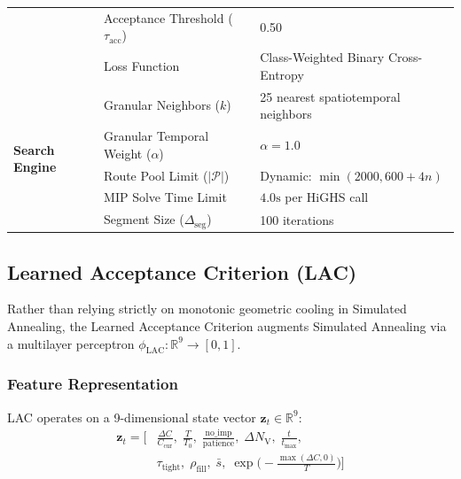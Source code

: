 \documentclass{ieeeaccess}
\newcommand{\NV}{{N_\mathrm{V}}}
\begin{document}
\begin{table}[!t]
\begin{tabularx}{\columnwidth}{l l X}
  & Acceptance Threshold ($\tau_{\text{acc}}$) & 0.50 \\
  & Loss Function & Class-Weighted Binary Cross-Entropy \\
\midrule
\multirow{5}{*}{\textbf{Search Engine}} 
  & Granular Neighbors ($k$) & 25 nearest spatiotemporal neighbors \\
  & Granular Temporal Weight ($\alpha$) & $\alpha = 1.0$ \\
  & Route Pool Limit ($|\mathcal{P}|$) & Dynamic: $\min(2000, 600 + 4n)$ \\
  & MIP Solve Time Limit & $4.0\text{s}$ per HiGHS call \\
  & Segment Size ($\Delta_{\text{seg}}$) & 100 iterations \\
\bottomrule
\end{tabularx}
\end{table}

\subsection{Learned Acceptance Criterion (LAC)}
\label{sec:lac_formulation}

Rather than relying strictly on monotonic geometric cooling in Simulated Annealing, the Learned Acceptance Criterion augments Simulated Annealing via a multilayer perceptron $\phi_{\text{LAC}}: \mathbb{R}^9 \to [0, 1]$.

\subsubsection{Feature Representation}
LAC operates on a 9-dimensional state vector $\mathbf{z}_t \in \mathbb{R}^9$:
\begin{align}
  \mathbf{z}_t = \Big[ 
    &\frac{\Delta C}{C_{\text{cur}}}, \; \frac{T}{T_0}, \; \frac{\text{no\_imp}}{\text{patience}}, \; \Delta \NV, \; \frac{t}{t_{\max}}, \nonumber \\
    &\tau_{\text{tight}}, \; \rho_{\text{fill}}, \; \bar{s}, \; \exp\Big(-\frac{\max(\Delta C, 0)}{T}\Big)
  \Big]
  \label{eq:lac_features}
\end{align}
\end{document}
